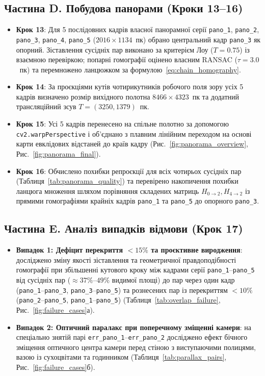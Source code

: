 \documentclass[14pt, a4paper]{extarticle}
\begin{document}
\subsection{Частина D. Побудова панорами (Кроки 13--16)}
\begin{itemize}
    \item \textbf{Крок 13}: Для 5 послідовних кадрів власної панорамної серії \texttt{pano\_1}, \texttt{pano\_2}, \texttt{pano\_3}, \texttt{pano\_4}, \texttt{pano\_5} ($2016 \times 1134$~пк) обрано центральний кадр \texttt{pano\_3} як опорний. Зіставлення сусідніх пар виконано за критерієм Лоу ($T=0.75$) із взаємною перевіркою; попарні гомографії оцінено власним RANSAC ($\tau=3.0$~пк) та перемножено ланцюжком за формулою~\eqref{eq:chain_homography}.
    \item \textbf{Крок 14}: За проєкціями кутів чотирикутників робочого поля зору усіх 5 кадрів визначено розмір вихідного полотна $8466 \times 4323$~пк та додатний трансляційний зсув $T = (3250, 1379)$~пк.
    \item \textbf{Крок 15}: Усі 5 кадрів перенесено на спільне полотно за допомогою \texttt{cv2.warpPerspective} і об'єднано з плавним лінійним переходом на основі карти евклідових відстаней до країв кадру (Рис.~\ref{fig:panorama_overview}, Рис.~\ref{fig:panorama_final}).
    \item \textbf{Крок 16}: Обчислено похибки репроєкції для всіх чотирьох сусідніх пар (Таблиця~\ref{tab:panorama_quality}) та перевірено накопичення похибки ланцюга множення шляхом порівняння складених матриць $H_{0 \to 2}, H_{4 \to 2}$ із прямими гомографіями крайніх кадрів \texttt{pano\_1} та \texttt{pano\_5} до опорного \texttt{pano\_3}.
\end{itemize}

\subsection{Частина E. Аналіз випадків відмови (Крок 17)}
\begin{itemize}
    \item \textbf{Випадок 1: Дефіцит перекриття $< 15\%$ та проєктивне виродження}: досліджено зміну якості зіставлення та геометричної правдоподібності гомографії при збільшенні кутового кроку між кадрами серії \texttt{pano\_1}--\texttt{pano\_5} від сусідніх пар ($\approx 37\%$--$49\%$ видимої площі) до пар через один кадр (\texttt{pano\_1}--\texttt{pano\_3}, \texttt{pano\_3}--\texttt{pano\_5}) та рознесених пар із перекриттям $< 10\%$ (\texttt{pano\_2}--\texttt{pano\_5}, \texttt{pano\_1}--\texttt{pano\_5}) (Таблиця~\ref{tab:overlap_failure}, Рис.~\ref{fig:failure_cases}а).
    \item \textbf{Випадок 2: Оптичний паралакс при поперечному зміщенні камери}: на спеціально знятій парі \texttt{err\_pano\_1}--\texttt{err\_pano\_2} досліджено ефект бічного зміщення оптичного центра камери перед стіною з виступаючими полицями, вазою із сухоцвітами та годинником (Таблиця~\ref{tab:parallax_pairs}, Рис.~\ref{fig:failure_cases}б).
\end{itemize}
\end{document}
